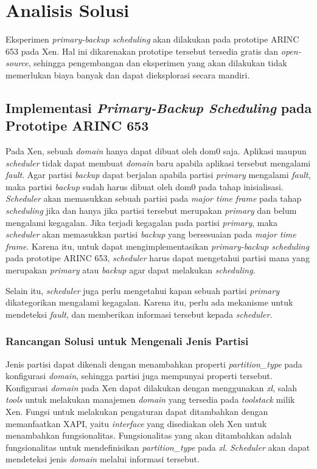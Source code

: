 \section{Analisis Solusi}

Eksperimen \textit{primary-backup scheduling} akan dilakukan pada prototipe ARINC 653 pada Xen.
Hal ini dikarenakan prototipe tersebut tersedia gratis dan \textit{open-source}, sehingga pengembangan dan eksperimen yang akan dilakukan tidak memerlukan biaya banyak dan dapat dieksplorasi secara mandiri.

\subsection{Implementasi \textit{Primary-Backup Scheduling} pada Prototipe ARINC 653}

Pada Xen, sebuah \textit{domain} hanya dapat dibuat oleh dom0 saja.
Aplikasi maupun \textit{scheduler} tidak dapat membuat \textit{domain} baru apabila aplikasi tersebut mengalami \textit{fault}.
Agar partisi \textit{backup} dapat berjalan apabila partisi \textit{primary} mengalami \textit{fault}, maka partisi \textit{backup} sudah harus dibuat oleh dom0 pada tahap inisialisasi.
\textit{Scheduler} akan memasukkan sebuah partisi pada \textit{major time frame} pada tahap \textit{scheduling} jika dan hanya jika partisi tersebut merupakan \textit{primary} dan belum mengalami kegagalan.
Jika terjadi kegagalan pada partisi \textit{primary}, maka \textit{scheduler} akan memasukkan partisi \textit{backup} yang bersesuaian pada \textit{major time frame}.
Karena itu, untuk dapat mengimplementasikan \textit{primary-backup scheduling} pada prototipe ARINC 653, \textit{scheduler} harus dapat mengetahui partisi mana yang merupakan \textit{primary} atau \textit{backup} agar dapat melakukan \textit{scheduling}.

Selain itu, \textit{scheduler} juga perlu mengetahui kapan sebuah partisi \textit{primary} dikategorikan mengalami kegagalan.
Karena itu, perlu ada mekanisme untuk mendeteksi \textit{fault}, dan memberikan informasi tersebut kepada \textit{scheduler}.

\subsubsection{Rancangan Solusi untuk Mengenali Jenis Partisi}

Jenis partisi dapat dikenali dengan menambahkan properti \textit{partition\_type} pada konfigurasi \textit{domain}, sehingga partisi juga mempunyai properti tersebut.
Konfigurasi \textit{domain} pada Xen dapat dilakukan dengan menggunakan \textit{xl}, salah \textit{tools} untuk melakukan manajemen \textit{domain} yang tersedia pada \textit{toolstack} milik Xen.
Fungsi untuk melakukan pengaturan dapat ditambahkan dengan memanfaatkan XAPI, yaitu \textit{interface} yang disediakan oleh Xen untuk menambahkan fungsionalitas.
Fungsionalitas yang akan ditambahkan adalah fungsionalitas untuk mendefinisikan \textit{partition\_type} pada \textit{xl}.
\textit{Scheduler} akan dapat mendeteksi jenis \textit{domain} melalui informasi tersebut.

